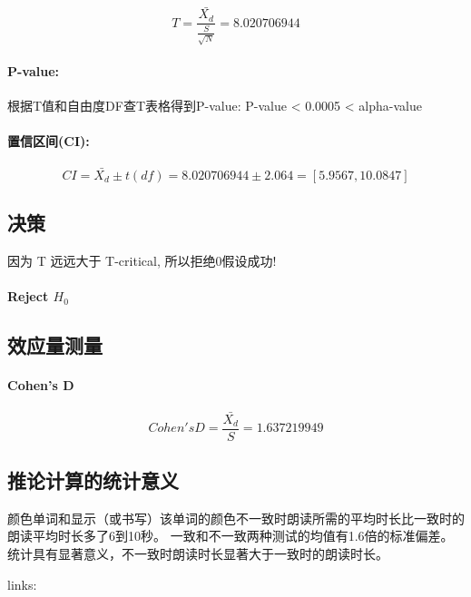 \documentclass[11pt]{article}
\begin{document}
\[T = \frac {\bar{X_d}}{\frac {S}{\sqrt {N}}} = 8.020706944\]

\paragraph{P-value:}\label{p-value}

根据T值和自由度DF查T表格得到P-value: P-value \textless{} 0.0005
\textless{} alpha-value

\paragraph{置信区间(CI):}\label{ux7f6eux4fe1ux533aux95f4ci}

\[CI = \bar {X_d} \pm t(df) = 8.020706944 \pm 2.064 = [5.9567,10.0847]\]

    \subsection{决策}\label{ux51b3ux7b56}

因为 T 远远大于 T-critical, 所以拒绝0假设成功!

\paragraph{\texorpdfstring{Reject
\(H_0\)}{Reject H\_0}}\label{reject-h_0}

    \subsection{效应量测量}\label{ux6548ux5e94ux91cfux6d4bux91cf}

\paragraph{Cohen's D}\label{cohens-d}

\[ Cohen's D = \frac {\bar {X_d}}{S} = 1.637219949\]

    \subsection{推论计算的统计意义}\label{ux63a8ux8bbaux8ba1ux7b97ux7684ux7edfux8ba1ux610fux4e49}

颜色单词和显示（或书写）该单词的颜色不一致时朗读所需的平均时长比一致时的朗读平均时长多了6到10秒。
一致和不一致两种测试的均值有1.6倍的标准偏差。
统计具有显著意义，不一致时朗读时长显著大于一致时的朗读时长。

    links:
\end{document}
